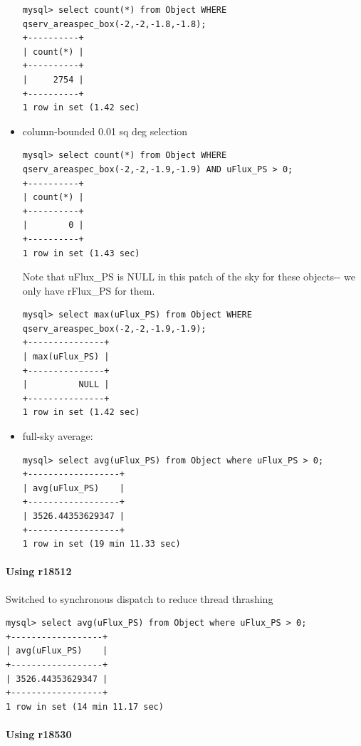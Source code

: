 \documentclass[DM,toc]{lsstdoc}
\begin{document}
\begin{itemize}
\begin{verbatim}
mysql> select count(*) from Object WHERE qserv_areaspec_box(-2,-2,-1.8,-1.8);
+----------+
| count(*) |
+----------+
|     2754 |
+----------+
1 row in set (1.42 sec)
\end{verbatim}

\item
  column-bounded 0.01 sq deg selection

\begin{verbatim}
mysql> select count(*) from Object WHERE qserv_areaspec_box(-2,-2,-1.9,-1.9) AND uFlux_PS > 0;
+----------+
| count(*) |
+----------+
|        0 |
+----------+
1 row in set (1.43 sec)
\end{verbatim}

Note that uFlux\_PS is NULL in this patch of the sky for these
objects-\/- we only have rFlux\_PS for them.

\begin{verbatim}
mysql> select max(uFlux_PS) from Object WHERE qserv_areaspec_box(-2,-2,-1.9,-1.9);
+---------------+
| max(uFlux_PS) |
+---------------+
|          NULL |
+---------------+
1 row in set (1.42 sec)
\end{verbatim}

\item
  full-sky average:

\begin{verbatim}
mysql> select avg(uFlux_PS) from Object where uFlux_PS > 0;
+------------------+
| avg(uFlux_PS)    |
+------------------+
| 3526.44353629347 |
+------------------+
1 row in set (19 min 11.33 sec)
\end{verbatim}
\end{itemize}

\paragraph{Using r18512}\label{using-r18512}

Switched to synchronous dispatch to reduce thread thrashing

\begin{verbatim}
mysql> select avg(uFlux_PS) from Object where uFlux_PS > 0;
+------------------+
| avg(uFlux_PS)    |
+------------------+
| 3526.44353629347 |
+------------------+
1 row in set (14 min 11.17 sec)
\end{verbatim}

\paragraph{Using r18530}\label{using-r18530}
\end{document}
